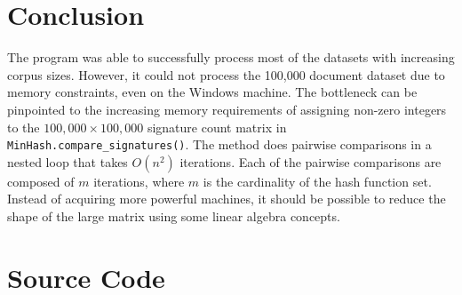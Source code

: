 \documentclass[11pt]{article}
\begin{document}
\section{Conclusion}

The program was able to successfully process most of the datasets with increasing corpus sizes. However, it could not process the 100,000 document dataset due to memory constraints, even on the Windows machine. The bottleneck can be pinpointed to the increasing memory requirements of assigning non-zero integers to the $100,000 \times 100,000$ signature count matrix in \\ \texttt{MinHash.compare\_signatures()}. The method does pairwise comparisons in a nested loop that takes $O(n^2)$ iterations. Each of the pairwise comparisons are composed of $m$ iterations, where $m$ is the cardinality of the hash function set. Instead of acquiring more powerful machines, it should be possible to reduce the shape of the large matrix using some linear algebra concepts.

{}



\clearpage
\newpage
\appendix
{}

\section{Source Code} \label{appendix:src}


\end{document}
